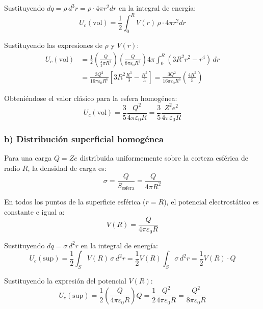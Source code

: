 \begin{problema}
Sustituyendo $dq = \rho \, d^3r = \rho \cdot 4\pi r^2 dr$ en la integral de energía:
\begin{equation}
U_c(\text{vol}) = \frac{1}{2} \int_0^R V(r) \, \rho \cdot 4\pi r^2 dr
\end{equation}

Sustituyendo las expresiones de $\rho$ y $V(r)$:
\begin{align}
U_c(\text{vol}) &= \frac{1}{2} \left( \frac{Q}{\frac{4}{3}\pi R^3} \right) \left( \frac{Q}{8\pi\varepsilon_0 R^3} \right) 4\pi \int_0^R (3R^2 r^2 - r^4) \, dr \nonumber \\
&= \frac{3 Q^2}{16\pi\varepsilon_0 R^6} \left[ 3R^2 \frac{R^3}{3} - \frac{R^5}{5} \right] = \frac{3 Q^2}{16\pi\varepsilon_0 R^6} \left( \frac{4 R^5}{5} \right)
\end{align}

Obteniéndose el valor clásico para la esfera homogénea:
\begin{equation}
U_c(\text{vol}) = \frac{3}{5} \frac{Q^2}{4\pi\varepsilon_0 R} = \frac{3}{5} \frac{Z^2 e^2}{4\pi\varepsilon_0 R}
\end{equation}

\subsubsection*{b) Distribución superficial homogénea}

Para una carga $Q = Z e$ distribuida uniformemente sobre la corteza esférica de radio $R$, la densidad de carga es:
\begin{equation}
\sigma = \frac{Q}{S_{\text{esfera}}} = \frac{Q}{4\pi R^2}
\end{equation}

En todos los puntos de la superficie esférica ($r = R$), el potencial electrostático es constante e igual a:
\begin{equation}
V(R) = \frac{Q}{4\pi\varepsilon_0 R}
\end{equation}

Sustituyendo $dq = \sigma \, d^2r$ en la integral de energía:
\begin{equation}
U_c(\text{sup}) = \frac{1}{2} \int_S V(R) \, \sigma \, d^2r = \frac{1}{2} V(R) \int_S \sigma \, d^2r = \frac{1}{2} V(R) \cdot Q
\end{equation}

Sustituyendo la expresión del potencial $V(R)$:
\begin{equation}
U_c(\text{sup}) = \frac{1}{2} \left( \frac{Q}{4\pi\varepsilon_0 R} \right) Q = \frac{1}{2} \frac{Q^2}{4\pi\varepsilon_0 R} = \frac{Q^2}{8\pi\varepsilon_0 R}
\end{equation}


\end{problema}
